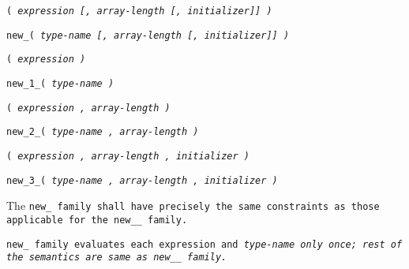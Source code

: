 
\s\s\s\tt{(} \it{expression}
[\tt{,} \it{array-length}
[\tt{,} \it{initializer}]] \tt{)}

 \tt{new_}\s\s\s\tt{(} \it{type-name}
[\tt{,} \it{array-length}
[\tt{,} \it{initializer}]] \tt{)}

\s\tt{(} \it{expression} \tt{)}

 \tt{new_1_}\s\tt{(} \it{type-name}  \tt{)}

\s\tt{(} \it{expression}
\phantom{[}\tt{,} \it{array-length}\phantom{]} \tt{)}

 \tt{new_2_}\s\tt{(} \it{type-name}
\phantom{[}\tt{,} \it{array-length}\phantom{]} \tt{)}

\s\tt{(} \it{expression}
\phantom{[}\tt{,} \it{array-length}
\phantom{[}\tt{,} \it{initializer}\phantom{]]} \tt{)}

 \tt{new_3_}\s\tt{(} \it{type-name}
\phantom{[}\tt{,} \it{array-length}
\phantom{[}\tt{,} \it{initializer}\phantom{]]} \tt{)}


The \tt{new_} family shall have precisely the same
constraints as those applicable for the \tt{new__} family.


\tt{new_} family evaluates each expression and \it{type-name} only once;
rest of the semantics are same as \tt{new__} family.
